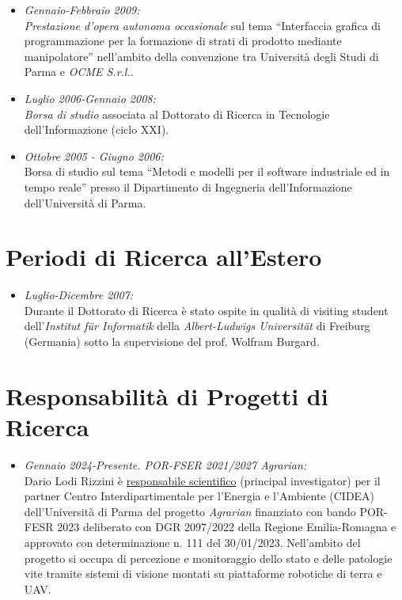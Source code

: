 \documentclass[11pt]{article}
\newcommand{\ITEMDATE}[1]{\item \textit{#1:}\\}
\begin{document}
\begin{itemize}
\begin{itemize}
\ITEMDATE{Gennaio-Febbraio 2009} 
\emph{Prestazione d'opera autonoma occasionale} sul tema ``Interfaccia grafica di 
programmazione per la formazione di strati di prodotto mediante manipolatore'' 
nell'ambito della convenzione tra Universit\`a degli Studi di Parma e \emph{OCME S.r.l.}.

\ITEMDATE{Luglio 2006-Gennaio 2008} 
\emph{Borsa di studio} associata al Dottorato di Ricerca in Tecnologie dell'Informazione (ciclo XXI).

\ITEMDATE{Ottobre 2005 - Giugno 2006}
Borsa di studio sul tema ``Metodi e modelli per il software 
industriale ed in tempo reale'' presso %
il Dipartimento di Ingegneria dell'Informazione dell'Universit\`a di Parma.

\end{itemize}


\section*{Periodi di Ricerca all'Estero}

\begin{itemize}

\ITEMDATE{Luglio-Dicembre 2007} 
Durante il Dottorato di Ricerca \`e stato ospite in qualit\`a di visiting student 
dell'\textit{Institut f\"ur Informatik} della \textit{Albert-Ludwigs Universit\"at} 
di Freiburg (Germania) sotto la supervisione del prof. Wolfram Burgard.

\end{itemize}


\section*{Responsabilit\`a di Progetti di Ricerca}

\begin{itemize}

\ITEMDATE{Gennaio 2024-Presente. POR-FSER 2021/2027 Agrarian}
Dario Lodi Rizzini \`e \ul{responsabile scientifico} (principal investigator) per il partner Centro Interdipartimentale per l'Energia e l'Ambiente (CIDEA) dell'Universit\`a di Parma del progetto \emph{Agrarian} finanziato con bando POR-FESR 2023 deliberato con DGR 2097/2022 della Regione Emilia-Romagna e approvato con determinazione n. 111 del 30/01/2023. 
Nell'ambito del progetto si occupa di percezione e monitoraggio dello stato e delle patologie vite tramite sistemi di visione montati su piattaforme robotiche di terra e UAV.  


\end{itemize}
\end{itemize}
\end{document}
